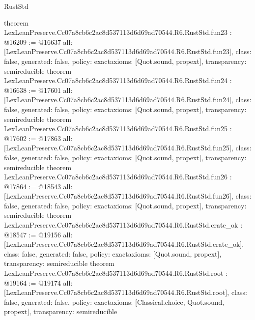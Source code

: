 \begin{lexlean}{RustStd}
\begin{coremodule}
{}
theorem LexLeanPreserve.Cc07a8cb6c2ac8d537113d6d69ad70544.R6.RustStd.fun23 : @16209 := @16637 {
  all: [LexLeanPreserve.Cc07a8cb6c2ac8d537113d6d69ad70544.R6.RustStd.fun23],
  class: false,
  generated: false,
  policy: exact{axioms: [Quot.sound, propext]},
  transparency: semireducible
}
theorem LexLeanPreserve.Cc07a8cb6c2ac8d537113d6d69ad70544.R6.RustStd.fun24 : @16638 := @17601 {
  all: [LexLeanPreserve.Cc07a8cb6c2ac8d537113d6d69ad70544.R6.RustStd.fun24],
  class: false,
  generated: false,
  policy: exact{axioms: [Quot.sound, propext]},
  transparency: semireducible
}
theorem LexLeanPreserve.Cc07a8cb6c2ac8d537113d6d69ad70544.R6.RustStd.fun25 : @17602 := @17863 {
  all: [LexLeanPreserve.Cc07a8cb6c2ac8d537113d6d69ad70544.R6.RustStd.fun25],
  class: false,
  generated: false,
  policy: exact{axioms: [Quot.sound, propext]},
  transparency: semireducible
}
theorem LexLeanPreserve.Cc07a8cb6c2ac8d537113d6d69ad70544.R6.RustStd.fun26 : @17864 := @18543 {
  all: [LexLeanPreserve.Cc07a8cb6c2ac8d537113d6d69ad70544.R6.RustStd.fun26],
  class: false,
  generated: false,
  policy: exact{axioms: [Quot.sound, propext]},
  transparency: semireducible
}
theorem LexLeanPreserve.Cc07a8cb6c2ac8d537113d6d69ad70544.R6.RustStd.crate_ok : @18547 := @19156 {
  all: [LexLeanPreserve.Cc07a8cb6c2ac8d537113d6d69ad70544.R6.RustStd.crate_ok],
  class: false,
  generated: false,
  policy: exact{axioms: [Quot.sound, propext]},
  transparency: semireducible
}
theorem LexLeanPreserve.Cc07a8cb6c2ac8d537113d6d69ad70544.R6.RustStd.root : @19164 := @19174 {
  all: [LexLeanPreserve.Cc07a8cb6c2ac8d537113d6d69ad70544.R6.RustStd.root],
  class: false,
  generated: false,
  policy: exact{axioms: [Classical.choice, Quot.sound, propext]},
  transparency: semireducible
}


\end{coremodule}
\end{lexlean}
